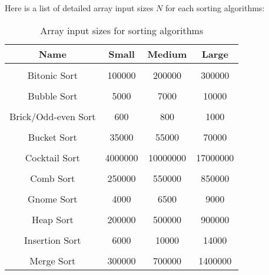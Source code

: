 Here is a list of detailed array input sizes \(N\) for each sorting algorithms:
\begin{table}[h!]
\centering
\begin{tabular}{||c c c c||} 
\hline
Name & Small & Medium & Large \\ [1ex] 
\hline\hline
 & & & \\
Bitonic Sort & 100000 & 200000 & 300000 \\ 
 & & & \\
Bubble Sort & 5000 & 7000 & 10000 \\ 
 & & & \\
Brick/Odd-even Sort & 600 & 800 & 1000 \\ 
 & & & \\
Bucket Sort & 35000 & 55000 & 70000 \\ 
 & & & \\
Cocktail Sort & 4000000 & 10000000 & 17000000 \\ 
 & & & \\
Comb Sort & 250000 & 550000 & 850000 \\ 
 & & & \\
Gnome Sort & 4000 & 6500 & 9000 \\ 
 & & & \\
Heap Sort & 200000 & 500000 & 900000 \\ 
 & & & \\
Insertion Sort & 6000 & 10000 & 14000 \\ 
 & & & \\
Merge Sort & 300000 & 700000 & 1400000 \\ [1ex]
\hline
\end{tabular}
\caption{Array input sizes for sorting algorithms}
\label{table:time_complexity_1}
\end{table}

